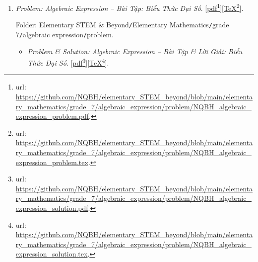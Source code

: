 \documentclass[12pt,twoside]{book}
\begin{document}
\begin{enumerate}
	Folder: {\sf Elementary STEM \& Beyond{\tt/}Elementary Mathematics{\tt/}grade 7{\tt/}probability \& statistics{\tt/}problem}.
	\begin{itemize}
		\item {\it Problem \& Solution: Probability \& Statistics -- Bài Tập \& Lời Giải: Xác Suất \& Thống Kê}. [\href{https://github.com/NQBH/elementary_STEM_beyond/blob/main/elementary_mathematics/grade_7/probability_statistics/solution/NQBH_probability_statistics_solution.pdf}{pdf}\footnote{{\sc url}: \url{https://github.com/NQBH/elementary_STEM_beyond/blob/main/elementary_mathematics/grade_7/probability_statistics/solution/NQBH_probability_statistics_solution.pdf}.}][\href{https://github.com/NQBH/elementary_STEM_beyond/blob/main/elementary_mathematics/grade_7/probability_statistics/solution/NQBH_probability_statistics_solution.tex}{\TeX}\footnote{{\sc url}: \url{https://github.com/NQBH/elementary_STEM_beyond/blob/main/elementary_mathematics/grade_7/probability_statistics/solution/NQBH_probability_statistics_solution.tex}.}].
		
		Folder: {\sf Elementary STEM \& Beyond{\tt/}Elementary Mathematics{\tt/}grade 7{\tt/}probability \& statistics{\tt/}solution}.
	\end{itemize}	
	
	\item {\it Problem: Algebraic Expression -- Bài Tập: Biểu Thức Đại Số}. [\href{https://github.com/NQBH/elementary_STEM_beyond/blob/main/elementary_mathematics/grade_7/algebraic_expression/problem/NQBH_algebraic_expression_problem.pdf}{pdf}\footnote{{\sc url}: \url{https://github.com/NQBH/elementary_STEM_beyond/blob/main/elementary_mathematics/grade_7/algebraic_expression/problem/NQBH_algebraic_expression_problem.pdf}.}][\href{https://github.com/NQBH/elementary_STEM_beyond/blob/main/elementary_mathematics/grade_7/algebraic_expression/problem/NQBH_algebraic_expression_problem.tex}{\TeX}\footnote{{\sc url}: \url{https://github.com/NQBH/elementary_STEM_beyond/blob/main/elementary_mathematics/grade_7/algebraic_expression/problem/NQBH_algebraic_expression_problem.tex}.}].
	
	Folder: {\sf Elementary STEM \& Beyond{\tt/}Elementary Mathematics{\tt/}grade 7{\tt/}algebraic expression{\tt/}problem}.
	\begin{itemize}
		\item {\it Problem \& Solution: Algebraic Expression -- Bài Tập \& Lời Giải: Biểu Thức Đại Số}. [\href{https://github.com/NQBH/elementary_STEM_beyond/blob/main/elementary_mathematics/grade_7/algebraic_expression/problem/NQBH_algebraic_expression_solution.pdf}{pdf}\footnote{{\sc url}: \url{https://github.com/NQBH/elementary_STEM_beyond/blob/main/elementary_mathematics/grade_7/algebraic_expression/problem/NQBH_algebraic_expression_solution.pdf}.}][\href{https://github.com/NQBH/elementary_STEM_beyond/blob/main/elementary_mathematics/grade_7/algebraic_expression/problem/NQBH_algebraic_expression_solution.tex}{\TeX}\footnote{{\sc url}: \url{https://github.com/NQBH/elementary_STEM_beyond/blob/main/elementary_mathematics/grade_7/algebraic_expression/problem/NQBH_algebraic_expression_solution.tex}.}].
		

\end{itemize}
\end{enumerate}
\end{document}
